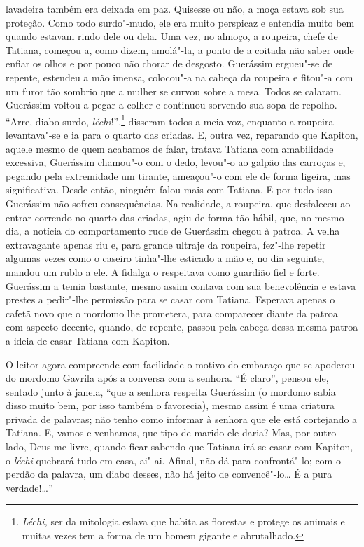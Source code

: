 {lavadeira também era deixada em paz. Quisesse ou não, a moça estava sob
sua proteção. Como todo surdo"-mudo, ele era muito perspicaz e entendia
muito bem quando estavam rindo dele ou dela. Uma vez, no almoço, a
roupeira, chefe de Tatiana, começou a, como dizem, amolá"-la, a ponto de
a coitada não saber onde enfiar os olhos e por pouco não chorar de
desgosto. Guerássim ergueu"-se de repente, estendeu a mão imensa,
colocou"-a na cabeça da roupeira e fitou"-a com um furor tão sombrio que
a mulher se curvou sobre a mesa. Todos se calaram. Guerássim voltou a
pegar a colher e continuou sorvendo sua sopa de repolho. ``Arre, diabo
surdo, \emph{léchi}!'',\footnote{\emph{Léchi,} ser da mitologia eslava
  que habita as florestas e protege os animais e muitas vezes tem a
  forma de um homem gigante e abrutalhado.} disseram todos a meia voz,
enquanto a roupeira levantava"-se e ia para o quarto das criadas. E,
outra vez, reparando que Kapiton, aquele mesmo de quem acabamos de
falar, tratava Tatiana com amabilidade excessiva, Guerássim chamou"-o com
o dedo, levou"-o ao galpão das carroças e, pegando pela extremidade um
tirante, ameaçou"-o com ele de forma ligeira, mas significativa. Desde
então, ninguém falou mais com Tatiana. E por tudo isso Guerássim não
sofreu consequências. Na realidade, a roupeira, que desfaleceu ao entrar
correndo no quarto das criadas, agiu de forma tão hábil, que, no mesmo
dia, a notícia do comportamento rude de Guerássim chegou à patroa. A
velha extravagante apenas riu e, para grande ultraje da roupeira,
fez"-lhe repetir algumas vezes como o caseiro tinha"-lhe esticado a mão e, no dia seguinte, mandou um rublo a ele. A fidalga o respeitava
como guardião fiel e forte. Guerássim a temia bastante, mesmo assim
contava com sua benevolência e estava prestes a pedir"-lhe permissão para
se casar com Tatiana. Esperava apenas o cafetã novo que o mordomo lhe
prometera, para comparecer diante da patroa com aspecto decente, quando,
de repente, passou pela cabeça dessa mesma patroa a ideia de casar
Tatiana com Kapiton.}

O leitor agora compreende com facilidade o motivo do embaraço que se
apoderou do mordomo Gavrila após a conversa com a senhora. ``É claro'',
pensou ele, sentado junto à janela, ``que a senhora respeita Guerássim
(o mordomo sabia disso muito bem, por isso também o favorecia), mesmo
assim é uma criatura privada de palavras; não tenho como informar à
senhora que ele está cortejando a Tatiana. E, vamos e venhamos, que tipo
de marido ele daria? Mas, por outro lado, Deus me livre, quando ficar
sabendo que Tatiana irá se casar com Kapiton, o \emph{léchi} quebrará
tudo em casa, ai"-ai. Afinal, não dá para confrontá"-lo; com o perdão da
palavra, um diabo desses, não há jeito de convencê"-lo\ldots{} É a pura
verdade!\ldots{}''

